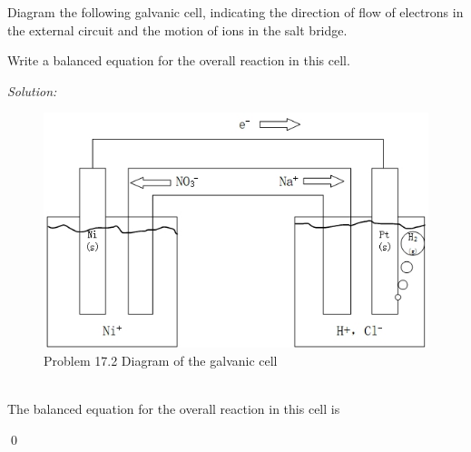 \documentclass[12pt]{article}
\newenvironment{problem}[2][Problem]{\begin{trivlist}
\item[\hskip \labelsep {\bfseries #1}\hskip \labelsep {\bfseries #2.}]}{\end{trivlist}}
\newenvironment{sol}
    {\emph{Solution:}
    }
    {
    \qed
    }
\begin{document}
\begin{problem}{17.2}
Diagram the following galvanic cell, indicating the direction of flow of electrons in the external circuit and the motion of ions in the salt bridge.
\begin{center}
\end{center}
Write a balanced equation for the overall reaction in this cell.
\end{problem}
\begin{sol}
\begin{figure}[h]
\centering
\includegraphics[scale=.8]{17_2.jpg}
\caption{Problem 17.2 Diagram of the galvanic cell}
\end{figure}
\\The balanced equation for the overall reaction in this cell is 
\end{sol}
\end{document}
